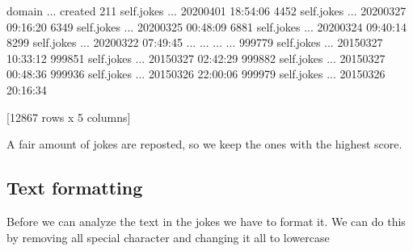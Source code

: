 \documentclass[letterpaper,10pt,english]{jupyterBook}
\begin{document}
\begin{sphinxVerbatim}[commandchars=\\\{\}]
\PYG{p}{[}\PYG{p}{[} \PYG{p}{]}\PYG{p}{]}
\end{sphinxVerbatim}

\begin{sphinxVerbatim}[commandchars=\\\{\}]
            domain  ...             created
211     self.jokes  ... 2020\PYGZhy{}04\PYGZhy{}01 18:54:06
4452    self.jokes  ... 2020\PYGZhy{}03\PYGZhy{}27 09:16:20
6349    self.jokes  ... 2020\PYGZhy{}03\PYGZhy{}25 00:48:09
6881    self.jokes  ... 2020\PYGZhy{}03\PYGZhy{}24 09:40:14
8299    self.jokes  ... 2020\PYGZhy{}03\PYGZhy{}22 07:49:45
...            ...  ...                 ...
999779  self.jokes  ... 2015\PYGZhy{}03\PYGZhy{}27 10:33:12
999851  self.jokes  ... 2015\PYGZhy{}03\PYGZhy{}27 02:42:29
999882  self.jokes  ... 2015\PYGZhy{}03\PYGZhy{}27 00:48:36
999936  self.jokes  ... 2015\PYGZhy{}03\PYGZhy{}26 22:00:06
999979  self.jokes  ... 2015\PYGZhy{}03\PYGZhy{}26 20:16:34

[12867 rows x 5 columns]
\end{sphinxVerbatim}

\sphinxAtStartPar
A fair amount of jokes are reposted, so we keep the ones with the highest score.

\begin{sphinxVerbatim}[commandchars=\\\{\}]
   \PYG{p}{[} \PYG{p}{]} 
\end{sphinxVerbatim}


\subsection{Text formatting}
\label{\detokenize{c7_case_studies/Jokes:text-formatting}}
\sphinxAtStartPar
Before we can analyze the text in the jokes we have to format it. We can do this by removing all special character and changing it all to lowercase
\end{document}

